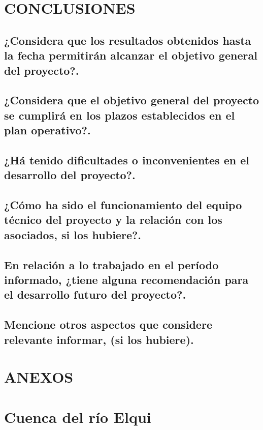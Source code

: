 \documentclass[11pt,]{article}
\begin{document}
		\bigskip
		
\section{CONCLUSIONES}\bigskip
		
		\subsection{¿Considera que los resultados obtenidos hasta la fecha permitirán alcanzar el objetivo general del proyecto?.}\bigskip
				
		\subsection{¿Considera que el objetivo general del proyecto se cumplirá en los plazos establecidos en el plan operativo?.}\bigskip
				
		\subsection{¿Há tenido dificultades o inconvenientes en el desarrollo del proyecto?.}\bigskip
				
		\subsection{¿Cómo ha sido el funcionamiento del equipo técnico del proyecto y la relación con los asociados, si los hubiere?.}\bigskip
				
		\subsection{En relación a lo trabajado en el período informado, ¿tiene alguna recomendación para el desarrollo futuro del proyecto?.}\bigskip
				
		\subsection{Mencione otros aspectos que considere relevante informar, (si los hubiere).}\bigskip
				

\section{ANEXOS}
				
\bigskip
				
				
\section{Cuenca del río Elqui}\bigskip
\end{document}
